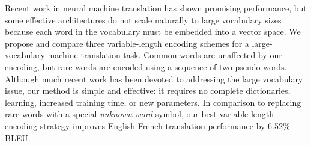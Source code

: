 Recent work in neural machine translation has shown promising performance, but some effective
architectures do not scale naturally to large vocabulary sizes because each
word in the vocabulary must be embedded into a vector space. We propose and compare
three variable-length encoding schemes for a large-vocabulary machine
translation task. Common words are unaffected by our encoding, but rare
words are encoded using a sequence of two pseudo-words. Although much recent work
has been devoted to addressing the large vocabulary issue, our method is simple and effective:
it requires no complete dictionaries, learning, increased training time, or new parameters. In comparison to
replacing rare words with a special \emph{unknown word} symbol, our best
variable-length encoding strategy improves English-French translation
performance by 6.52\% BLEU.
